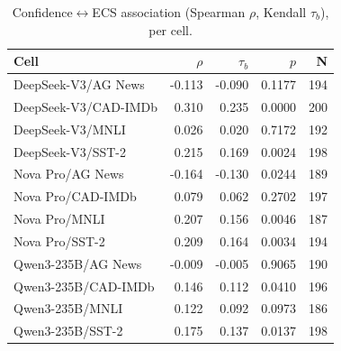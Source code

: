 \begin{table}[t]
\centering
\small
\setlength{\tabcolsep}{3.5pt}
\caption{Confidence$\leftrightarrow$ECS association (Spearman $\rho$, Kendall $\tau_b$), per cell.}
\label{tab:confidence}
\begin{tabular}{lrrrr}
\toprule
Cell & $\rho$ & $\tau_b$ & $p$ & N \\
\midrule
DeepSeek-V3/AG News & -0.113 & -0.090 & 0.1177 & 194 \\
DeepSeek-V3/CAD-IMDb & 0.310 & 0.235 & 0.0000 & 200 \\
DeepSeek-V3/MNLI & 0.026 & 0.020 & 0.7172 & 192 \\
DeepSeek-V3/SST-2 & 0.215 & 0.169 & 0.0024 & 198 \\
Nova Pro/AG News & -0.164 & -0.130 & 0.0244 & 189 \\
Nova Pro/CAD-IMDb & 0.079 & 0.062 & 0.2702 & 197 \\
Nova Pro/MNLI & 0.207 & 0.156 & 0.0046 & 187 \\
Nova Pro/SST-2 & 0.209 & 0.164 & 0.0034 & 194 \\
Qwen3-235B/AG News & -0.009 & -0.005 & 0.9065 & 190 \\
Qwen3-235B/CAD-IMDb & 0.146 & 0.112 & 0.0410 & 196 \\
Qwen3-235B/MNLI & 0.122 & 0.092 & 0.0973 & 186 \\
Qwen3-235B/SST-2 & 0.175 & 0.137 & 0.0137 & 198 \\
\bottomrule
\end{tabular}
\end{table}
